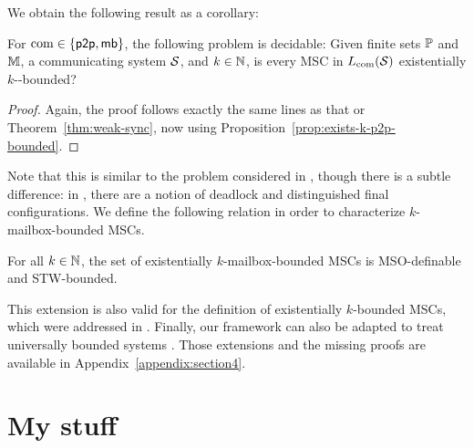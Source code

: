 \documentclass{article}
\begin{document}
We obtain the following result as a corollary:

\begin{theorem}\label{thm:exists-sync}
For $\textup{com} \in \{\mathsf{p2p}, \mathsf{mb}\}$, the following problem is decidable:
Given finite sets $\mathbb{P}$ and $\mathbb{M}$, a communicating system $\mathcal{S}$, and $k \in \mathbb{N}$,
is every MSC in $L_{\textup{com}}(\mathcal{S})$ existentially $k$-\pp-bounded?
\end{theorem}

\begin{proof}
Again, the proof follows exactly the same lines as that or Theorem~\ref{thm:weak-sync},
now using Proposition~\ref{prop:exists-k-p2p-bounded}.
\end{proof}

Note that this is similar to the problem considered
in \cite{GKM07,kuske2014communicating},
though there is a subtle difference: in \cite{GKM07,kuske2014communicating},
there are a notion of deadlock and distinguished final configurations.
We define the following relation in order to characterize $k$-mailbox-bounded MSCs.


\begin{proposition}\label{prop:exist-k-mailbox-bounded}
	For all $k \in \mathbb{N}$, the set of existentially $k$-mailbox-bounded MSCs
	is MSO-definable and STW-bounded.
\end{proposition}



This extension is also valid for the \pp definition of existentially $k$-bounded MSCs, which
were addressed in \cite{GKM07}. Finally, our framework can also be adapted to treat universally bounded systems \cite{HENRIKSEN20051,DBLP:conf/fossacs/LohreyM02}. Those extensions and the missing proofs are available in Appendix~\ref{appendix:section4}.

\section{My stuff}


\end{document}
